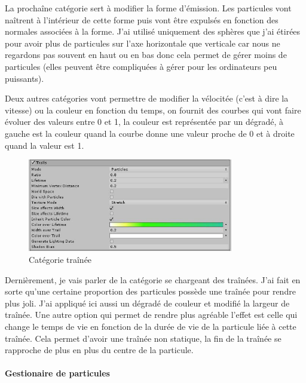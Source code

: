 \documentclass{article}
\begin{document}
La prochaîne catégorie sert à modifier la forme d'émission. Les particules vont naîtrent à l'intérieur de cette forme puis vont être expulsés en fonction des normales associées à la forme. J'ai utilisé uniquement des sphères que j'ai étirées pour avoir plus de particules sur l'axe horizontale que verticale car nous ne regardons pas souvent en haut ou en bas donc cela permet de gérer moins de particules (elles peuvent être compliquées à gérer pour les ordinateurs peu puissants).

Deux autres catégories vont permettre de modifier la vélocitée (c'est à dire la vitesse) ou la couleur en fonction du temps, on fournit des courbes qui vont faire évoluer des valeurs entre 0 et 1, la couleur est représentée par un dégradé, à gauche est la couleur quand la courbe donne une valeur proche de 0 et à droite quand la valeur est 1.

\begin{figure}[H]
    \centering
    \includegraphics[width=0.8\textwidth]{cc/particles_trail.JPG}
    \caption{Catégorie traînée}
    \label{Catégorie traînée}
\end{figure}

Dernièrement, je vais parler de la catégorie se chargeant des traînées. J'ai fait en sorte qu'une certaine proportion des particules possède une traînée pour rendre plus joli. J'ai appliqué ici aussi un dégradé de couleur et modifié la largeur de traînée. Une autre option qui permet de rendre plus agréable l'effet est celle qui change le temps de vie en fonction de la durée de vie de la particule liée à cette traînée. Cela permet d'avoir une traînée non statique, la fin de la traînée se rapproche de plus en plus du centre de la particule.

\paragraph{Gestionaire de particules}
\end{document}
